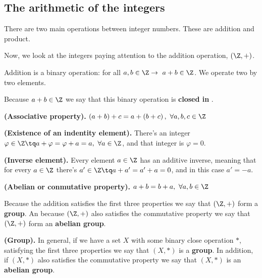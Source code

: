 \subsection{The arithmetic of the integers}
There are two main operations between integer numbers. These are addition and product.

Now, we look at the integers paying attention to the addition operation, $\left( \Z, + \right) $.
\begin{remark}
    Addition is a binary operation: for all $a, b\in\Z\rightarrow\ a + b\in\Z$. We operate two by two elements.
\end{remark}

Because $a + b\in\Z$ we say that this binary operation is \textbf{closed in \Z}.

\begin{proposition}
    \textbf{(Associative property).} $\left( a + b \right) + c = a + \left( b + c \right) ,\ \forall a, b, c\in\Z$
\end{proposition}
\begin{proposition}
    \textbf{(Existence of an indentity element).} There's an integer $\varphi\in\Z \tq a + \varphi = \varphi + a = a,\ \forall a\in\Z$, and that integer is $\varphi = 0$.
\end{proposition}
\begin{proposition}
    \textbf{(Inverse element).} Every element $a\in\Z$ has an additive inverse, meaning that for every $a\in\Z$ there's $a'\in\Z\tq a + a' = a' + a = 0$, and in this case $a' = -a$.
\end{proposition}
\begin{proposition}
    \textbf{(Abelian or conmutative property).} $a + b = b + a,\ \forall a, b\in\Z$
\end{proposition}

Because the addition satisfies the first three properties we say that $\left( \Z, + \right) $ form a \textbf{group}. An because $\left( \Z, + \right) $ also satisfies the commutative property we say that $\left( \Z, + \right) $ form an \textbf{abelian group}.

\begin{definition}
    \textbf{(Group).} In general, if we have a set $X$ with some binary close operation $*$, satisfying the first three properties we say that $\left( X, * \right) $ is a \textbf{group}. In addition, if $\left( X, * \right) $ also satisfies the commutative property we say that $\left( X, * \right) $ is an \textbf{abelian group}.
\end{definition}

